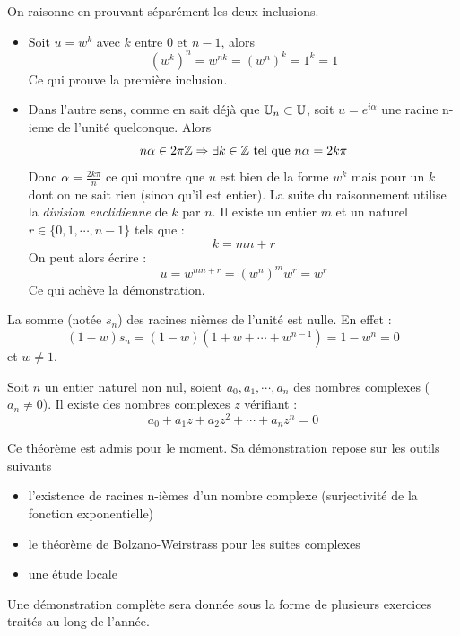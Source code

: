 \begin{demo}
 On raisonne en prouvant séparément les deux inclusions.
\begin{itemize}
 \item Soit $u=w^k$ avec $k$ entre $0$ et $n-1$, alors 
\begin{displaymath}
 (w^k)^n= w^{nk}=(w^n)^k= 1^k =1
\end{displaymath}
Ce qui prouve la première inclusion.

\item Dans l'autre sens, comme en sait déjà que $\mathbb{U}_n \subset \mathbb{U}$, soit $u=e^{i\alpha}$ une racine n-ieme de l'unité quelconque. Alors
\begin{displaymath}
 n\alpha \in 2\pi \mathbb{Z} \Rightarrow \exists k \in \mathbb{Z} \text{ tel que } n\alpha = 2k\pi
\end{displaymath}
Donc $\alpha = \frac{2k\pi}{n}$ ce qui montre que $u$ est bien de la forme $w^k$ mais pour un $k$ dont on ne sait rien (sinon qu'il est entier). La suite du raisonnement utilise la \emph{division euclidienne} de $k$ par $n$. Il existe un entier $m$ et un naturel $r\in \{0,1,\cdots,n-1\}$ tels que :
\begin{displaymath}
 k = m n +r
\end{displaymath}
 On peut alors écrire :
\begin{displaymath}
 u= w^{mn+r}=(w^n)^m w^r = w^r
\end{displaymath}
Ce qui achève la démonstration.
\end{itemize}
\end{demo}
\begin{rem}
 La somme (notée $s_n$) des racines nièmes de l'unité est nulle. En effet :
\begin{displaymath}
 (1-w)s_n = (1-w) (1 + w + \cdots + w^{n-1}) = 1 - w^n = 0
\end{displaymath}
et $w\neq 1$.
\end{rem}

\begin{thm}
Soit $n$ un entier naturel non nul, soient $a_0,a_1,\cdots,a_n$ des nombres complexes ($a_n\neq 0$). Il existe des nombres complexes $z$ vérifiant :
\begin{displaymath}
 a_0 + a_1z + a_2 z^2 + \cdots +a_nz^n = 0
\end{displaymath}
\end{thm}
Ce théorème est admis pour le moment. Sa démonstration repose sur les outils suivants
\begin{itemize}
 \item l'existence de racines n-ièmes d'un nombre complexe (surjectivité de la fonction exponentielle)
 \item le théorème de Bolzano-Weirstrass pour les suites complexes
 \item une étude \og locale\fg~
\end{itemize}
Une démonstration complète sera donnée sous la forme de plusieurs exercices traités au long de l'année.


